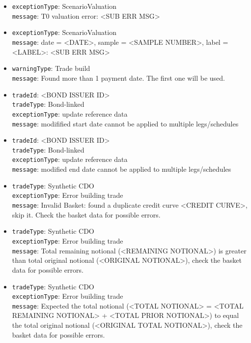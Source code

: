 \begin{itemize}
  \item \lstinline!exceptionType!: ScenarioValuation \\
        \lstinline!message!: T0 valuation error: <SUB ERR MSG>

  \item \lstinline!exceptionType!: ScenarioValuation \\
        \lstinline!message!: date = <DATE>, sample = <SAMPLE NUMBER>, label = <LABEL>: <SUB ERR MSG>

  \item \lstinline!warningType!: Trade build \\
        \lstinline!message!: Found more than 1 payment date. The first one will be used.

  \item \lstinline!tradeId!: <BOND ISSUER ID> \\
        \lstinline!tradeType!: Bond-linked \\
        \lstinline!exceptionType!: update reference data \\
        \lstinline!message!: modifified start date cannot be applied to multiple legs/schedules

  \item \lstinline!tradeId!: <BOND ISSUER ID> \\
        \lstinline!tradeType!: Bond-linked \\
        \lstinline!exceptionType!: update reference data \\
        \lstinline!message!: modified end date cannot be applied to multiple legs/schedules

  \item \lstinline!tradeType!: Synthetic CDO \\
        \lstinline!exceptionType!: Error building trade \\
        \lstinline!message!: Invalid Basket: found a duplicate credit curve <CREDIT CURVE>, skip it. Check the basket data for possible errors.

  \item \lstinline!tradeType!: Synthetic CDO \\
        \lstinline!exceptionType!: Error building trade \\
        \lstinline!message!: Total remaining notional (<REMAINING NOTIONAL>) is greater than total original notional (<ORIGINAL NOTIONAL>), check the basket data for possible errors.

  \item \lstinline!tradeType!: Synthetic CDO \\
        \lstinline!exceptionType!: Error building trade \\
        \lstinline!message!: Expected the total notional (<TOTAL NOTIONAL> = <TOTAL REMAINING NOTIONAL> + <TOTAL PRIOR NOTIONAL>) to equal the total original notional (<ORIGINAL TOTAL NOTIONAL>), check the basket data for possible errors.


\end{itemize}
